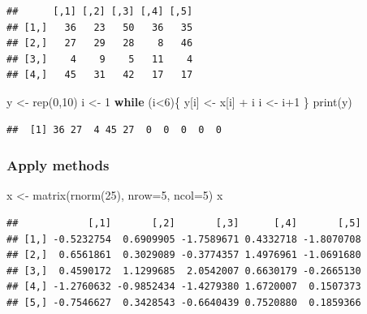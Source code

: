 \documentclass[]{article}
\newenvironment{Shaded}{\begin{snugshade}}{\end{snugshade}}
\newcommand{\AttributeTok}[1]{\textcolor[rgb]{0.77,0.63,0.00}{#1}}
\newcommand{\ControlFlowTok}[1]{\textcolor[rgb]{0.13,0.29,0.53}{\textbf{#1}}}
\newcommand{\DecValTok}[1]{\textcolor[rgb]{0.00,0.00,0.81}{#1}}
\newcommand{\FunctionTok}[1]{\textcolor[rgb]{0.00,0.00,0.00}{#1}}
\newcommand{\NormalTok}[1]{#1}
\newcommand{\OtherTok}[1]{\textcolor[rgb]{0.56,0.35,0.01}{#1}}
\newcommand{\SpecialCharTok}[1]{\textcolor[rgb]{0.00,0.00,0.00}{#1}}
\begin{document}
\begin{verbatim}
##      [,1] [,2] [,3] [,4] [,5]
## [1,]   36   23   50   36   35
## [2,]   27   29   28    8   46
## [3,]    4    9    5   11    4
## [4,]   45   31   42   17   17
\end{verbatim}

\begin{Shaded}
\begin{Highlighting}[]
\NormalTok{y }\OtherTok{\textless{}{-}} \FunctionTok{rep}\NormalTok{(}\DecValTok{0}\NormalTok{,}\DecValTok{10}\NormalTok{)}
\NormalTok{i }\OtherTok{\textless{}{-}} \DecValTok{1}
\ControlFlowTok{while}\NormalTok{ (i}\SpecialCharTok{\textless{}}\DecValTok{6}\NormalTok{)\{}
\NormalTok{  y[i] }\OtherTok{\textless{}{-}}\NormalTok{ x[i] }\SpecialCharTok{+}\NormalTok{ i}
\NormalTok{  i }\OtherTok{\textless{}{-}}\NormalTok{ i}\SpecialCharTok{+}\DecValTok{1}
\NormalTok{\}}
\FunctionTok{print}\NormalTok{(y)}
\end{Highlighting}
\end{Shaded}

\begin{verbatim}
##  [1] 36 27  4 45 27  0  0  0  0  0
\end{verbatim}

\hypertarget{apply-methods}{%
\subsubsection{Apply methods}\label{apply-methods}}

\begin{Shaded}
\begin{Highlighting}[]
\NormalTok{x }\OtherTok{\textless{}{-}} \FunctionTok{matrix}\NormalTok{(}\FunctionTok{rnorm}\NormalTok{(}\DecValTok{25}\NormalTok{), }\AttributeTok{nrow=}\DecValTok{5}\NormalTok{, }\AttributeTok{ncol=}\DecValTok{5}\NormalTok{)}
\NormalTok{x}
\end{Highlighting}
\end{Shaded}

\begin{verbatim}
##            [,1]       [,2]       [,3]      [,4]       [,5]
## [1,] -0.5232754  0.6909905 -1.7589671 0.4332718 -1.8070708
## [2,]  0.6561861  0.3029089 -0.3774357 1.4976961 -1.0691680
## [3,]  0.4590172  1.1299685  2.0542007 0.6630179 -0.2665130
## [4,] -1.2760632 -0.9852434 -1.4279380 1.6720007  0.1507373
## [5,] -0.7546627  0.3428543 -0.6640439 0.7520880  0.1859366
\end{verbatim}
\end{document}
